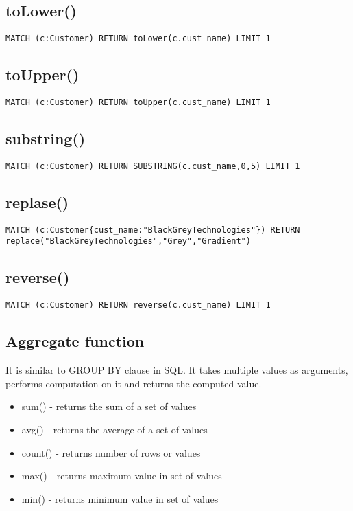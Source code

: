 \documentclass[../main.tex]{subfiles}
\begin{document}
\subsection{toLower()}
\begin{lstlisting}[language=cypher]
MATCH (c:Customer) RETURN toLower(c.cust_name) LIMIT 1
\end{lstlisting}

\subsection{toUpper()}
\begin{lstlisting}[language=cypher]
MATCH (c:Customer) RETURN toUpper(c.cust_name) LIMIT 1
\end{lstlisting}

\subsection{substring()}
\begin{lstlisting}[language=cypher]
MATCH (c:Customer) RETURN SUBSTRING(c.cust_name,0,5) LIMIT 1
\end{lstlisting}

\subsection{replase()}
\begin{lstlisting}[language=cypher]
MATCH (c:Customer{cust_name:"BlackGreyTechnologies"}) RETURN replace("BlackGreyTechnologies","Grey","Gradient")
\end{lstlisting}

\subsection{reverse()}
\begin{lstlisting}[language=cypher]
MATCH (c:Customer) RETURN reverse(c.cust_name) LIMIT 1
\end{lstlisting}

\subsection{Aggregate function}
It is similar to GROUP BY clause in SQL. It takes multiple values as arguments, performs computation on it and returns the computed value.

\begin{itemize}
	\item{sum() - returns the sum of a set of values}
	\item{avg() - returns the average of a set of values}
	\item{count() - returns number of rows or values}
	\item{max() - returns maximum value in set of values}
	\item{min() - returns minimum value in set of values}
\end{itemize}
 
\end{document}
